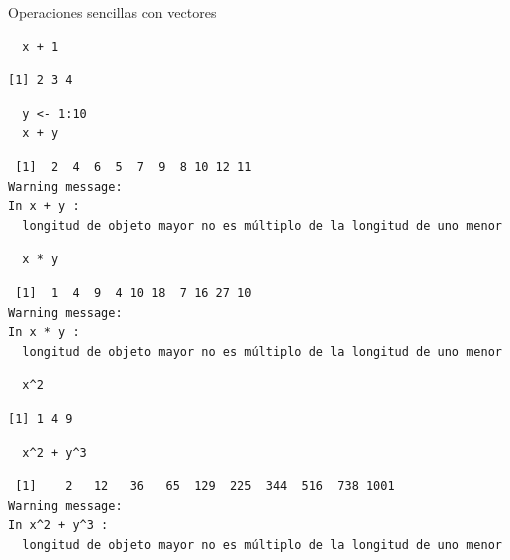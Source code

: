 \documentclass[xcolor={usenames,svgnames,dvipsnames}]{beamer}
\begin{document}
\begin{frame}[fragile,label=sec-2-1-2]{Operaciones sencillas con vectores}
 \lstset{language=R,label= ,caption= ,numbers=none}
\begin{lstlisting}
  x + 1
\end{lstlisting}

\begin{verbatim}
[1] 2 3 4
\end{verbatim}

\lstset{language=R,label= ,caption= ,numbers=none}
\begin{lstlisting}
  y <- 1:10
  x + y
\end{lstlisting}

\begin{verbatim}
 [1]  2  4  6  5  7  9  8 10 12 11
Warning message:
In x + y :
  longitud de objeto mayor no es múltiplo de la longitud de uno menor
\end{verbatim}

\lstset{language=R,label= ,caption= ,numbers=none}
\begin{lstlisting}
  x * y
\end{lstlisting}

\begin{verbatim}
 [1]  1  4  9  4 10 18  7 16 27 10
Warning message:
In x * y :
  longitud de objeto mayor no es múltiplo de la longitud de uno menor
\end{verbatim}

\lstset{language=R,label= ,caption= ,numbers=none}
\begin{lstlisting}
  x^2
\end{lstlisting}

\begin{verbatim}
[1] 1 4 9
\end{verbatim}

\lstset{language=R,label= ,caption= ,numbers=none}
\begin{lstlisting}
  x^2 + y^3
\end{lstlisting}

\begin{verbatim}
 [1]    2   12   36   65  129  225  344  516  738 1001
Warning message:
In x^2 + y^3 :
  longitud de objeto mayor no es múltiplo de la longitud de uno menor
\end{verbatim}
\end{frame}
\end{document}
